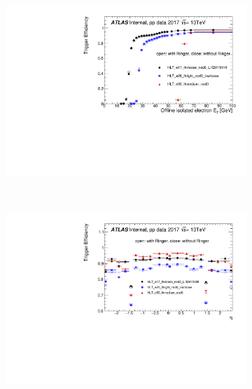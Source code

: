 \begin{figure}[h!tb]
  \begin{center}
  \begin{subfigure}[c]{.59\textwidth}
  \centering
  \includegraphics[width=\textwidth]{sections/04_operation/figures/efficiencies/eff_EGAM1_e17_e26_e60_2017_before_and_after_ts1_et.pdf}
  \caption{}%
  \end{subfigure}\\
  \begin{subfigure}[c]{.59\textwidth}
  \centering
  \includegraphics[width=\textwidth]{sections/04_operation/figures/efficiencies/eff_EGAM1_e17_e26_e60_2017_before_and_after_ts1_eta.pdf}
  \caption{}%
  \end{subfigure} \\

\end{center}
\end{figure}
